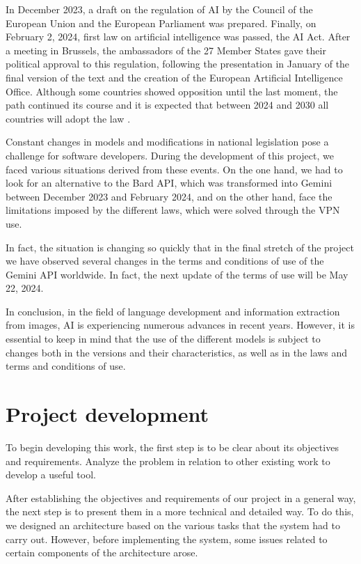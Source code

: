 In December 2023, a draft on the regulation of AI by the Council of the European Union and the European Parliament was prepared. Finally, on February 2, 2024, first law on artificial intelligence was passed, the AI Act. After a meeting in Brussels, the ambassadors of the 27 Member States gave their political approval to this regulation, following the presentation in January of the final version of the text and the creation of the European Artificial Intelligence Office. Although some countries showed opposition until the last moment, the path continued its course and it is expected that between 2024 and 2030 all countries will adopt the law \cite{ElDerecho-LeyIA}.

Constant changes in models and modifications in national legislation pose a challenge for software developers. During the development of this project, we faced various situations derived from these events. On the one hand, we had to look for an alternative to the Bard API, which was transformed into Gemini between December 2023 and February 2024, and on the other hand, face the limitations imposed by the different laws, which were solved through the VPN use.

In fact, the situation is changing so quickly that in the final stretch of the project we have observed several changes in the terms and conditions of use of the Gemini API worldwide. In fact, the next update of the terms of use will be May 22, 2024.

In conclusion, in the field of language development and information extraction from images, AI is experiencing numerous advances in recent years. However, it is essential to keep in mind that the use of the different models is subject to changes both in the versions and their characteristics, as well as in the laws and terms and conditions of use.
\section{Project development}
To begin developing this work, the first step is to be clear about its objectives and requirements. Analyze the problem in relation to other existing work to develop a useful tool.

After establishing the objectives and requirements of our project in a general way, the next step is to present them in a more technical and detailed way. To do this, we designed an architecture based on the various tasks that the system had to carry out. However, before implementing the system, some issues related to certain components of the architecture arose.

